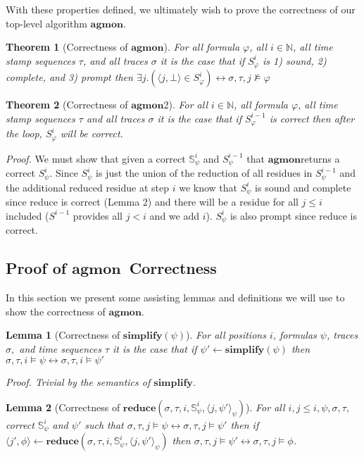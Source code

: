 \documentclass[10pt,a4paper]{article}
\newcommand{\rp}[2]{\ensuremath{\langle #1, #2 \rangle}}
\newcommand{\agmon}{\ensuremath{\mathbf{agmon}}}
\newcommand{\rpt}[3]{\ensuremath{\langle #1, #2 \rangle}_{#3}}
\newtheorem{thm}{Theorem}
\newtheorem{lemma}{Lemma}
\begin{document}
With these properties defined, we ultimately wish to prove the correctness of our top-level algorithm \agmon.

\begin{thm}[Correctness of \agmon]
For all formula $\varphi$, all $i \in \mathbb{N}$, all time stamp sequences $\tau$, and all traces $\sigma$ it is the case that if $S^i_{\varphi}$ is 1) sound, 2) complete, and 3) prompt then $\exists j.(\rp{j}{\bot} \in S^i_{\varphi}) \leftrightarrow \sigma, \tau, j \nvDash \varphi$
\end{thm}

\begin{thm}[Correctness of \agmon 2]
For all $i \in \mathbb{N}$, all formula $\varphi$, all time stamp sequences $\tau$ and all traces $\sigma$ it is the case that if $S^{i-1}_{\varphi}$ is correct then after the loop, $S^{i}_{\varphi}$ will be correct.
\end{thm}
\textit{Proof.} We must show that given a correct $\mathbb{S}^i_{\psi}$ and $S^{i-1}_{\psi}$ that \agmon returns a correct $S^i_{\psi}$. Since $S^i_{\psi}$ is just the union of the reduction of all residues in $S^{i-1}_{\psi}$ and the additional reduced residue at step $i$ we know that $S^i_{\psi}$ is sound and complete since reduce is correct (Lemma 2) and there will be a residue for all $j \leq i$ included ($S^{i-1}$ provides all $j < i$ and we add $i$). $S^i_{\psi}$ is also prompt since reduce is correct.

\subsection{Proof of \agmon\ Correctness}
In this section we present some assisting lemmas and definitions we will use to show the correctness of \agmon.

\begin{lemma}[Correctness of $\mathbf{simplify}(\psi)$] For all positions $i$, formulas $\psi$, traces $\sigma,$ and time sequences $\tau$ 
it is the case that if $\psi' \leftarrow \mathbf{simplify}(\psi)$ then $\sigma, \tau, i \vDash \psi \leftrightarrow \sigma, \tau, i \vDash \psi'$

Proof. Trivial by the semantics of $\mathbf{simplify}$.
\end{lemma}


\begin{lemma}[Correctness of $\mathbf{reduce}(\sigma, \tau, i, \mathbb{S}^i_{\psi}, \rpt{j}{\psi'}{\psi})$]
For all $i, j \leq i, \psi, \sigma, \tau,$ correct $\mathbb{S}^i_{\psi}$ and $\psi'$ such that $\sigma, \tau, j \vDash \psi \leftrightarrow \sigma, \tau, j \vDash \psi'$ then if $\rp{j'}{\phi} \leftarrow \mathbf{reduce}(\sigma,\tau,i,\mathbb{S}^i_{\psi}, \rpt{j}{\psi'}{\psi})$ then $\sigma, \tau, j \vDash \psi' \leftrightarrow \sigma, \tau, j \vDash \phi$.
\end{lemma}
\end{document}
